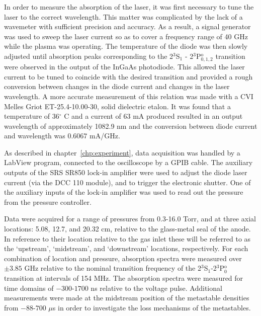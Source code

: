 In order to measure the absorption of the laser, it was first necessary to tune
the laser to the correct wavelength. This matter was complicated by the lack of
a wavemeter with sufficient precision and accuracy. As a result, a signal
generator was used to sweep the laser current so as to cover a frequency range
of 40 GHz while the plasma was operating. The temperature of the diode was then
slowly adjusted until absorption peaks corresponding to the 2$^3$S$_1$ -
2$^3$P$_{0,1,2}^\mathrm{o}$ transition were observed in the output of the InGaAs
photodiode. This allowed the laser current to be tuned to coincide with the
desired transition and provided a rough conversion between changes in the diode
current and changes in the laser wavelength. A more accurate measurement of this
relation was made with a CVI Melles Griot ET-25.4-10.00-30, solid dielectric
etalon. It was found that a temperature of 36$^\circ$ C and a current of 63 mA
produced resulted in an output wavelength of approximately 1082.9 nm and the
conversion between diode current and wavelength was $0.6067$ mA/GHz.

As described in chapter~\ref{chp:experiment}, data acquisition was handled by a
LabView program, connected to the oscilloscope by a GPIB cable. The auxiliary
outputs of the SRS SR850 lock-in amplifier were used to adjust the diode laser
current (via the DCC 110 module), and to trigger the electronic shutter. One of
the auxiliary inputs of the lock-in amplifier was used to read out the pressure
from the pressure controller.

Data were acquired for a range of pressures from 0.3-16.0 Torr, and at three
axial locations: 5.08, 12.7, and 20.32 cm, relative to the glass-metal seal of
the anode. In reference to their location relative to the gas inlet these will
be referred to as the `upstream', `midstream', and `downstream' locations,
respectively. For each combination of location and pressure, absorption spectra
were measured over $\pm3.85$ GHz relative to the nominal transition frequency of
the 2$^3$S$_1$-2$^3$P$_0^\mathrm{o}$ transition at intervals of 154 MHz. The
absorption spectra were measured for time domains of $-300$-$1700$ ns relative
to the voltage pulse. Additional measurements were made at the midstream
position of the metastable densities from $-88$-$700$ $\mu$s in order to
investigate the loss mechanisms of the metastables.

